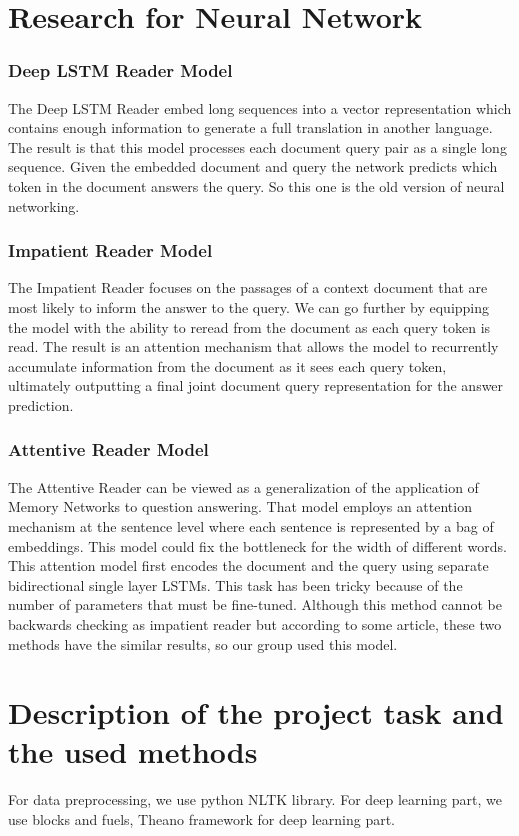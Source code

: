 \documentclass[runningheads,a4paper]{llncs}
\begin{document}
\section{Research for Neural Network}

\subsubsection*{Deep LSTM Reader Model}
The Deep LSTM Reader embed long sequences into a vector representation which contains enough information to generate a full translation in another language. The result is that this model processes each document query pair as a single long sequence. Given the embedded document and query the network predicts which token in the document answers the query. So this one is the old version of neural networking.

\subsubsection*{Impatient Reader Model}
The Impatient Reader focuses on the passages of a context document that are most likely to inform the answer to the query. We can go further by equipping the model with the ability to reread from the document as each query token is read. The result is an attention mechanism that allows the model to recurrently accumulate information from the document as it sees each query token, ultimately outputting a final joint document query representation for the answer prediction.

\subsubsection*{Attentive Reader Model}
The Attentive Reader can be viewed as a generalization of the application of Memory Networks to question answering. That model employs an attention mechanism at the sentence level where each sentence is represented by a bag of embeddings. This model could fix the bottleneck for the width of different words. This attention model first encodes the document and the query using separate bidirectional single layer LSTMs. This task has been tricky because of the number of parameters that must be fine-tuned.
Although this method cannot be backwards checking as impatient reader but according to some article, these two methods have the similar results, so our group used this model.


\section{Description of the project task and the used methods}
For data preprocessing, we use python NLTK library.
For deep learning part, we use blocks and fuels, Theano framework for deep learning part. 
\end{document}
